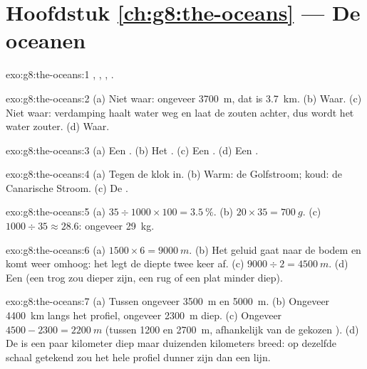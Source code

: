\section*{Hoofdstuk \ref{ch:g8:the-oceans} --- De oceanen}

\begin{solution}{exo:g8:the-oceans:1}
, , , .
\end{solution}

\begin{solution}{exo:g8:the-oceans:2}
(a) Niet waar: ongeveer \qty{3700}{m}, dat is \qty{3.7}{km}. (b) Waar. (c)
Niet waar: verdamping haalt water weg en laat de zouten achter, dus wordt
het water zouter. (d) Waar.
\end{solution}

\begin{solution}{exo:g8:the-oceans:3}
(a) Een . (b) Het . (c) Een . (d) Een .
\end{solution}

\begin{solution}{exo:g8:the-oceans:4}
(a) Tegen de klok in. (b) Warm: de Golfstroom; koud: de Canarische Stroom.
(c) De .
\end{solution}

\begin{solution}{exo:g8:the-oceans:5}
(a) $35 \div 1000 \times 100 = 3.5~\%$. (b) $20 \times 35 = \qty{700}{g}$.
(c) $1000 \div 35 \approx 28.6$: ongeveer \qty{29}{kg}.
\end{solution}

\begin{solution}{exo:g8:the-oceans:6}
(a) $1500 \times 6 = \qty{9000}{m}$. (b) Het geluid gaat naar de bodem en
komt weer omhoog: het legt de diepte twee keer af. (c) $9000 \div 2 =
\qty{4500}{m}$. (d) Een  (een trog zou dieper zijn, een rug
of een plat minder diep).
\end{solution}

\begin{solution}{exo:g8:the-oceans:7}
(a) Tussen ongeveer \qty{3500}{m} en \qty{5000}{m}. (b) Ongeveer
\qty{4400}{km} langs het profiel, ongeveer \qty{2300}{m} diep. (c) Ongeveer
$4500 - 2300 = \qty{2200}{m}$ (tussen 1200 en \qty{2700}{m}, afhankelijk
van de gekozen ). (d) De  is een paar kilometer diep maar
duizenden kilometers breed: op dezelfde schaal getekend zou het hele
profiel dunner zijn dan een lijn.
\end{solution}

